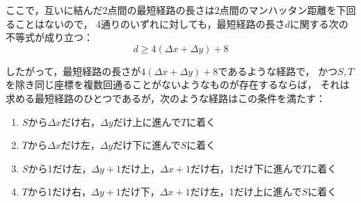 \documentclass{article}
\begin{document}
ここで，互いに結んだ2点間の最短経路の長さは2点間のマンハッタン距離を下回ることはないので，
4通りのいずれに対しても，最短経路の長さ$d$に関する次の不等式が成り立つ：
\begin{equation*}
    d \geq 4 (\Delta x + \Delta y) + 8
\end{equation*}

したがって，最短経路の長さが$4 (\Delta x + \Delta y) + 8$であるような経路で，
かつ$S, T$を除き同じ座標を複数回通ることがないようなものが存在するならば，
それは求める最短経路のひとつであるが，次のような経路はこの条件を満たす：
\begin{enumerate}
    \renewcommand{\labelenumi}{\roman{enumi}).}
    \item $S$から$\Delta x$だけ右，$\Delta y$だけ上に進んで$T$に着く
    \item $T$から$\Delta x$だけ左，$\Delta y$だけ下に進んで$S$に着く
    \item $S$から1だけ左，$\Delta y + 1$だけ上，$\Delta x + 1$だけ右，1だけ下に進んで$T$に着く
    \item $T$から1だけ右，$\Delta y + 1$だけ下，$\Delta x + 1$だけ左，1だけ上に進んで$S$に着く
\end{enumerate}
\end{document}
